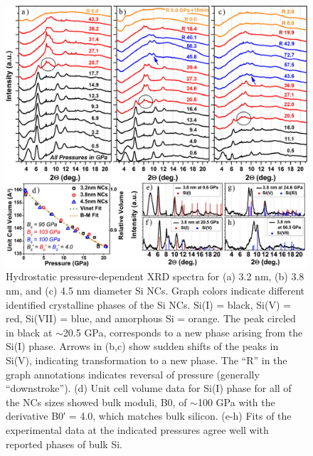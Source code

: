 \begin{figure}
\begin{center}
\includegraphics[width=\textwidth]{./chapter7/sipressure3.jpeg}
\caption[Pressure-dependent XRD patterns for Si NCs, phase analysis, and related XRD-derived structural data.]{Hydrostatic pressure-dependent XRD spectra for (a) 3.2 nm, (b) 3.8 nm, and (c) 4.5 nm diameter Si NCs. Graph colors indicate different identified crystalline phases of the Si NCs. Si(I) = black, Si(V) = red, Si(VII) = blue, and amorphous Si = orange. The peak circled in black at $\sim$20.5 GPa, corresponds to a new phase arising from the Si(I) phase. Arrows in (b,c) show sudden shifts of the peaks in Si(V), indicating transformation to a new phase. The “R” in the graph annotations indicates reversal of pressure (generally “downstroke”). (d) Unit cell volume data for Si(I) phase for all of the NCs sizes showed bulk moduli, B0, of $\sim$100 GPa with the derivative B0′ = 4.0, which matches bulk silicon. (e-h) Fits of the experimental data at the indicated pressures agree well with reported phases of bulk Si.}
\label{f:sipressure3}
\end{center}
\end{figure}

